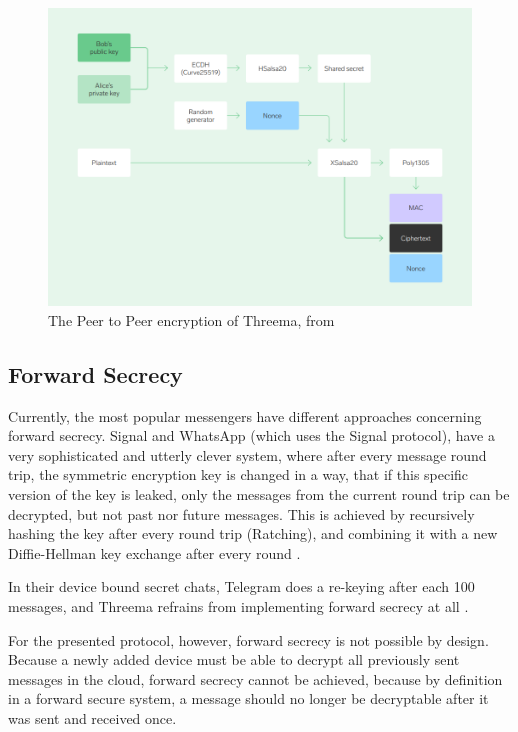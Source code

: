 \documentclass[a4paper, oneside]{discothesis}
\begin{document}
\begin{figure}[h!]
    \centering
    \includegraphics[width=\columnwidth]{figures/threema.png}
    \caption{The Peer to Peer encryption of Threema, from \cite{Threema}}
    \label{fig:peer_encryption}
\end{figure}

\subsection{Forward Secrecy}
\label{sec:forward_secrecy}

Currently, the most popular messengers have different approaches concerning forward secrecy. Signal and WhatsApp (which uses the Signal protocol), have a very sophisticated and utterly clever system, where after every message round trip, the symmetric encryption key is changed in a way, that if this specific version of the key is leaked, only the messages from the current round trip can be decrypted, but not past nor future messages. This is achieved by recursively hashing the key after every round trip (Ratching), and combining it with a new Diffie-Hellman key exchange after every round \cite{DoubleRatchet}.

In their device bound secret chats, Telegram does a re-keying after each 100 messages, and Threema refrains from implementing forward secrecy at all \cite{Threema}.

For the presented protocol, however, forward secrecy is not possible by design. Because a newly added device must be able to decrypt all previously sent messages in the cloud, forward secrecy cannot be achieved, because by definition in a forward secure system, a message should no longer be decryptable after it was sent and received once.
\end{document}
